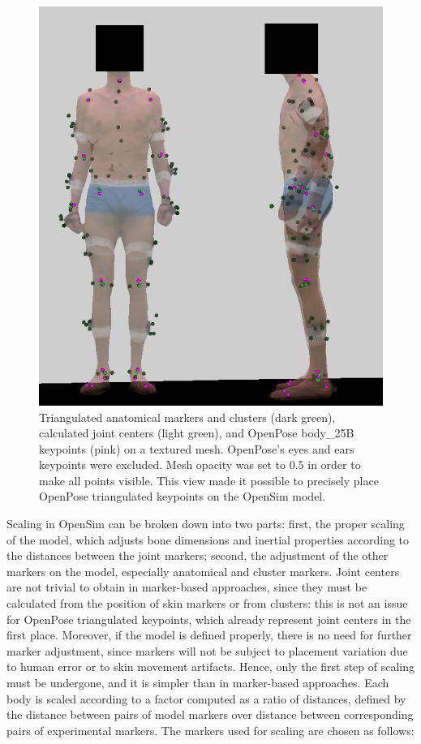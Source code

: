 \begin{figure}[!ht]
	\centering
	\def\svgwidth{1\columnwidth}
	\fontsize{10pt}{10pt}\selectfont
	\includegraphics[width=.95\linewidth]{"../Chap3/Figures/Fig_MkMkl.png"}
	\caption{Triangulated anatomical markers and clusters (dark green), calculated joint centers (light green), and OpenPose body\_25B keypoints (pink) on a textured mesh. OpenPose’s eyes and ears keypoints were excluded. Mesh opacity was set to 0.5 in order to make all points visible. This view made it possible to precisely place OpenPose triangulated keypoints on the OpenSim model.}
	\label{fig_mkmkl}
\end{figure}

Scaling in OpenSim can be broken down into two parts: first, the proper scaling of the model, which adjusts bone dimensions and inertial properties according to the distances between the joint markers; second, the adjustment of the other markers on the model, especially anatomical and cluster markers. Joint centers are not trivial to obtain in marker-based approaches, since they must be calculated from the position of skin markers or from clusters: this is not an issue for OpenPose triangulated keypoints, which already represent joint centers in the first place. Moreover, if the model is defined properly, there is no need for further marker adjustment, since markers will not be subject to placement variation due to human error or to skin movement artifacts. Hence, only the first step of scaling must be undergone, and it is simpler than in marker-based approaches. Each body is scaled according to a factor computed as a ratio of distances, defined by the distance between pairs of model markers over distance between corresponding pairs of experimental markers. The markers used for scaling are chosen as follows:

